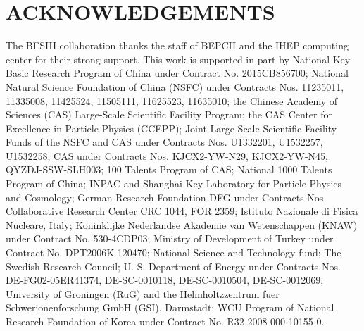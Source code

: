\documentclass[twocolumn,showpacs,aps,prd]{revtex4-1}
\begin{document}
  \section*{\boldmath ACKNOWLEDGEMENTS}
  The BESIII collaboration thanks the staff of BEPCII and the IHEP computing center for their strong support. This work is supported in part by National Key Basic Research Program of China under Contract No. 2015CB856700; National Natural Science Foundation of China (NSFC) under Contracts Nos. 11235011, 11335008, 11425524, 11505111, 11625523, 11635010; the Chinese Academy of Sciences (CAS) Large-Scale Scientific Facility Program; the CAS Center for Excellence in Particle Physics (CCEPP); Joint Large-Scale Scientific Facility Funds of the NSFC and CAS under Contracts Nos. U1332201, U1532257, U1532258; CAS under Contracts Nos. KJCX2-YW-N29, KJCX2-YW-N45, QYZDJ-SSW-SLH003; 100 Talents Program of CAS; National 1000 Talents Program of China; INPAC and Shanghai Key Laboratory for Particle Physics and Cosmology; German Research Foundation DFG under Contracts Nos. Collaborative Research Center CRC 1044, FOR 2359; Istituto Nazionale di Fisica Nucleare, Italy; Koninklijke Nederlandse Akademie van Wetenschappen (KNAW) under Contract No. 530-4CDP03; Ministry of Development of Turkey under Contract No. DPT2006K-120470; National Science and Technology fund; The Swedish Research Council; U. S. Department of Energy under Contracts Nos. DE-FG02-05ER41374, DE-SC-0010118, DE-SC-0010504, DE-SC-0012069; University of Groningen (RuG) and the Helmholtzzentrum fuer Schwerionenforschung GmbH (GSI), Darmstadt; WCU Program of National Research Foundation of Korea under Contract No. R32-2008-000-10155-0.
\end{document}
